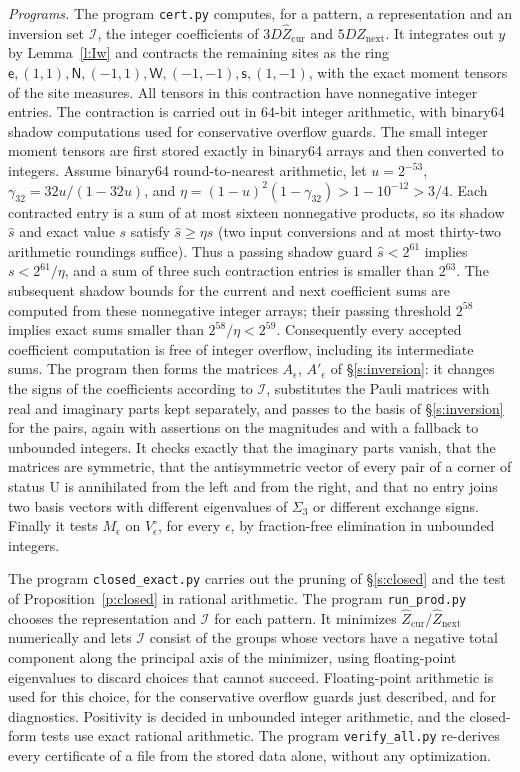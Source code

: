 \emph{Programs.} The program \texttt{cert.py} computes, for a pattern, a representation and an inversion set $\mathcal I$, the integer coefficients of $3 D \hat Z_{\mathrm{cur}}$ and $5 D \hat Z_{\mathrm{next}}$. It integrates out $y$ by Lemma~\ref{l:Iw} and contracts the remaining sites as the ring $\mathsf e, (1, 1), \mathsf N, (-1, 1), \mathsf W, (-1, -1), \mathsf s, (1, -1)$, with the exact moment tensors of the site measures. All tensors in this contraction have nonnegative integer entries. The contraction is carried out in $64$-bit integer arithmetic, with binary64 shadow computations used for conservative overflow guards. The small integer moment tensors are first stored exactly in binary64 arrays and then converted to integers. Assume binary64 round-to-nearest arithmetic, let $u=2^{-53}$, $\gamma_{32}=32u/(1-32u)$, and $\eta=(1-u)^2(1-\gamma_{32})>1-10^{-12}>3/4$. Each contracted entry is a sum of at most sixteen nonnegative products, so its shadow $\widehat s$ and exact value $s$ satisfy $\widehat s\ge\eta s$ (two input conversions and at most thirty-two arithmetic roundings suffice). Thus a passing shadow guard $\widehat s<2^{61}$ implies $s<2^{61}/\eta$, and a sum of three such contraction entries is smaller than $2^{63}$. The subsequent shadow bounds for the current and next coefficient sums are computed from these nonnegative integer arrays; their passing threshold $2^{58}$ implies exact sums smaller than $2^{58}/\eta<2^{59}$. Consequently every accepted coefficient computation is free of integer overflow, including its intermediate sums. The program then forms the matrices $A_\epsilon$, $A'_\epsilon$ of \S\ref{s:inversion}: it changes the signs of the coefficients according to $\mathcal I$, substitutes the Pauli matrices with real and imaginary parts kept separately, and passes to the basis of \S\ref{s:inversion} for the pairs, again with assertions on the magnitudes and with a fallback to unbounded integers. It checks exactly that the imaginary parts vanish, that the matrices are symmetric, that the antisymmetric vector of every pair of a corner of status $\mathrm U$ is annihilated from the left and from the right, and that no entry joins two basis vectors with different eigenvalues of $\Sigma_3$ or different exchange signs. Finally it tests $M_\epsilon$ on $V_\epsilon^{\circ}$, for every $\epsilon$, by fraction-free elimination in unbounded integers.

The program \texttt{closed\_exact.py} carries out the pruning of \S\ref{s:closed} and the test of Proposition~\ref{p:closed} in rational arithmetic. The program \texttt{run\_prod.py} chooses the representation and $\mathcal I$ for each pattern. It minimizes $\hat Z_{\mathrm{cur}} / \hat Z_{\mathrm{next}}$ numerically and lets $\mathcal I$ consist of the groups whose vectors have a negative total component along the principal axis of the minimizer, using floating-point eigenvalues to discard choices that cannot succeed. Floating-point arithmetic is used for this choice, for the conservative overflow guards just described, and for diagnostics. Positivity is decided in unbounded integer arithmetic, and the closed-form tests use exact rational arithmetic. The program \texttt{verify\_all.py} re-derives every certificate of a file from the stored data alone, without any optimization.

